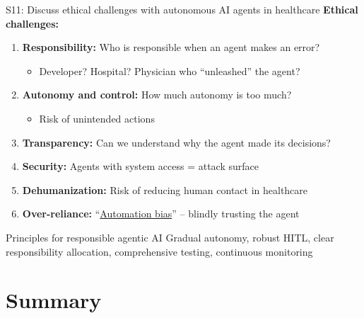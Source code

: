 \documentclass[aspectratio=169, 10pt]{beamer}
\begin{document}
\begin{frame}{S11: Discuss ethical challenges with autonomous AI agents in healthcare}
    \textbf{Ethical challenges:}
    
    \vspace{0.3cm}
    \begin{enumerate}
        \item \textbf{Responsibility:} Who is responsible when an agent makes an error?
        \begin{itemize}
            \item Developer? Hospital? Physician who ``unleashed'' the agent?
        \end{itemize}
        
        \item \textbf{Autonomy and control:} How much autonomy is too much?
        \begin{itemize}
            \item Risk of unintended actions
        \end{itemize}
        
        \item \textbf{Transparency:} Can we understand why the agent made its decisions?
        
        \item \textbf{Security:} Agents with system access = attack surface
        
        \item \textbf{Dehumanization:} Risk of reducing human contact in healthcare
        
        \item \textbf{Over-reliance:} ``\href{https://en.wikipedia.org/wiki/Automation_bias}{Automation bias}'' -- blindly trusting the agent
    \end{enumerate}
    
    \vspace{0.3cm}
    \begin{block}{Principles for responsible agentic AI}
        Gradual autonomy, robust HITL, clear responsibility allocation, comprehensive testing, continuous monitoring
    \end{block}
\end{frame}

\section*{Summary}
\end{document}
